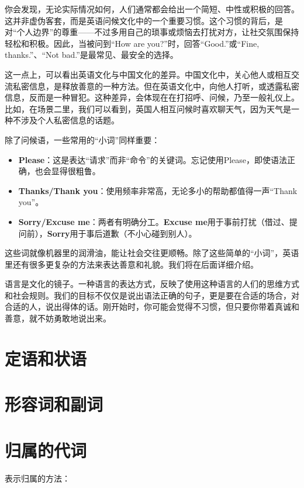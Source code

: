 \documentclass[10.5pt, a4paper]{ctexbook} %
\begin{document}
你会发现，无论实际情况如何，人们通常都会给出一个简短、中性或积极的回答。这并非虚伪客套，而是英语问候文化中的一个重要习惯。这个习惯的背后，是对“个人边界”的尊重——不过多用自己的琐事或烦恼去打扰对方，让社交氛围保持轻松和积极。因此，当被问到“How are you?”时，回答“Good.”或“Fine, thanks.”、“Not bad.”是最常见、最安全的选择。

这一点上，可以看出英语文化与中国文化的差异。中国文化中，关心他人或相互交流私密信息，是释放善意的一种方法。但在英语文化中，向他人打听，或透露私密信息，反而是一种冒犯。这种差异，会体现在在打招呼、问候，乃至一般礼仪上。比如，在场景二里，我们可以看到，英国人相互问候时喜欢聊天气，因为天气是一种不涉及个人私密信息的话题。

除了问候语，一些常用的“小词”同样重要：
\begin{itemize}
\item \textbf{Please}：这是表达“请求”而非“命令”的关键词。忘记使用Please，即使语法正确，也会显得很粗鲁。
\item \textbf{Thanks\;/\;Thank you}：使用频率非常高，无论多小的帮助都值得一声“Thank you”。
\item \textbf{Sorry\;/\;Excuse me}：两者有明确分工。\textbf{Excuse me}用于事前打扰（借过、提问前），\textbf{Sorry}用于事后道歉（不小心碰到别人）。
\end{itemize}

这些词就像机器里的润滑油，能让社会交往更顺畅。除了这些简单的“小词”，英语里还有很多更复杂的方法来表达善意和礼貌。我们将在后面详细介绍。

语言是文化的镜子。一种语言的表达方式，反映了使用这种语言的人们的思维方式和社会规则。我们的目标不仅仅是说出语法正确的句子，更是要在合适的场合，对合适的人，说出得体的话。刚开始时，你可能会觉得不习惯，但只要你带着真诚和善意，就不妨勇敢地说出来。


\section{定语和状语}

\section{形容词和副词}

\section{归属的代词}

表示归属的方法：

\begin{liju}
\end{liju}
\end{document}
